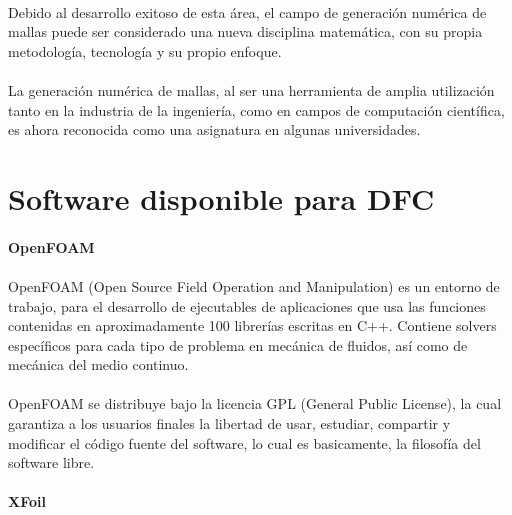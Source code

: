 \documentclass[letterpaper, openright, 12pt]{book}
\begin{document}
    \paragraph*{}
    Debido al desarrollo exitoso de esta área, el campo de generación numérica
    de mallas puede ser considerado una nueva disciplina matemática, con su
    propia metodología, tecnología y su propio enfoque.

    \paragraph*{}
    La generación numérica de mallas, al ser una herramienta de amplia
    utilización tanto en la industria de la ingeniería, como en campos de
    computación científica, es ahora reconocida como una asignatura en algunas
    universidades.\cite{liseikin1999grid}

    \section{Software disponible para DFC}
    \paragraph*{OpenFOAM}
    \paragraph*{}
    OpenFOAM (Open Source Field Operation and Manipulation) es un entorno de
    trabajo, para el desarrollo de ejecutables de aplicaciones que usa las
    funciones contenidas en aproximadamente 100 librerías escritas en C++.
    Contiene solvers específicos para cada tipo de problema en mecánica de
    fluidos, así como de mecánica del medio continuo.\cite{openfoam}

    \paragraph*{}
    OpenFOAM se distribuye bajo la licencia GPL (General Public License), la
    cual garantiza a los usuarios finales la libertad de usar, estudiar,
    compartir y modificar el código fuente del software, lo cual es
    basicamente, la filosofía del software libre.

    \paragraph*{XFoil}
\end{document}
